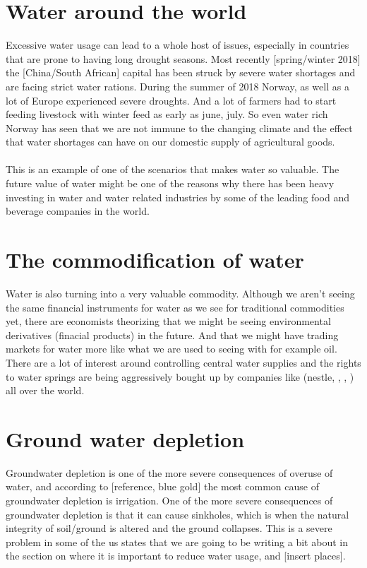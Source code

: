 \documentclass[]{uiophd}
\begin{document}
\section{Water around the world}
Excessive water usage can lead to a whole host of issues, especially in countries that are prone to having long drought seasons. Most recently [spring/winter 2018] the [China/South African] capital has been struck by severe water shortages and are facing strict water rations. During the summer of 2018 Norway, as well as a lot of Europe experienced severe droughts. And a lot of farmers had to start feeding livestock with winter feed as early as {june, july}. So even water rich Norway has seen that we are not immune to the changing climate and the effect that water shortages can have on our domestic supply of agricultural goods.
\\\\
This is an example of one of the scenarios that makes water so valuable. The future value of water might be one of the reasons why there has been heavy investing in water and water related industries by some of the leading food and beverage companies in the world.

\section{The commodification of water}
Water is also turning into a very valuable commodity. Although we aren’t seeing the same financial instruments for water as we see for traditional commodities yet, there are economists theorizing that we might be seeing environmental derivatives (finacial products) in the future. And that we might have trading markets for water more like what we are used to seeing with for example oil. There are a lot of interest around controlling central water supplies and the rights to water springs are being aggressively bought up by companies like (nestle, , , ) all over the world.

\section{Ground water depletion}
Groundwater depletion is one of the more severe consequences of overuse of water, and according to [reference, blue gold] the most common cause of groundwater depletion is irrigation. One of the more severe consequences of groundwater depletion is that it can cause sinkholes, which is when the natural integrity of soil/ground is altered and the ground collapses. This is a severe problem in some of the us states that we are going to be writing a bit about in the section on where it is important to reduce water usage, and [insert places].
\end{document}
